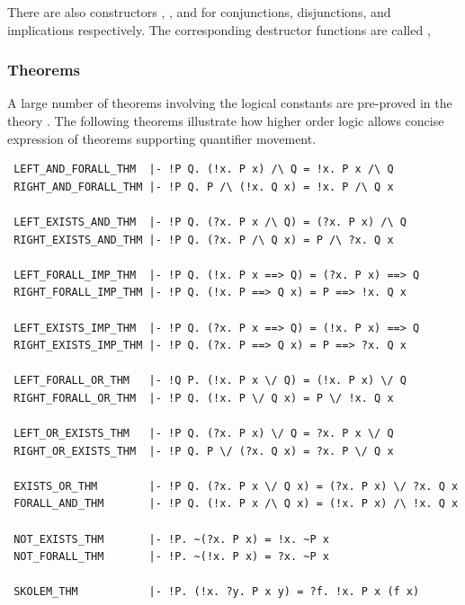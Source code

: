 \noindent There are also constructors
,
,
 and
for conjunctions, disjunctions, and implications respectively.
The corresponding destructor functions are called , \etc
%
%
%

\subsubsection{Theorems}

A large number of theorems involving the logical constants are
pre-proved in the theory . The following theorems
illustrate how higher order logic allows concise expression of
theorems supporting quantifier movement.

\begin{holboxed}
\begin{verbatim}
 LEFT_AND_FORALL_THM  |- !P Q. (!x. P x) /\ Q = !x. P x /\ Q
 RIGHT_AND_FORALL_THM |- !P Q. P /\ (!x. Q x) = !x. P /\ Q x

 LEFT_EXISTS_AND_THM  |- !P Q. (?x. P x /\ Q) = (?x. P x) /\ Q
 RIGHT_EXISTS_AND_THM |- !P Q. (?x. P /\ Q x) = P /\ ?x. Q x

 LEFT_FORALL_IMP_THM  |- !P Q. (!x. P x ==> Q) = (?x. P x) ==> Q
 RIGHT_FORALL_IMP_THM |- !P Q. (!x. P ==> Q x) = P ==> !x. Q x

 LEFT_EXISTS_IMP_THM  |- !P Q. (?x. P x ==> Q) = (!x. P x) ==> Q
 RIGHT_EXISTS_IMP_THM |- !P Q. (?x. P ==> Q x) = P ==> ?x. Q x

 LEFT_FORALL_OR_THM   |- !Q P. (!x. P x \/ Q) = (!x. P x) \/ Q
 RIGHT_FORALL_OR_THM  |- !P Q. (!x. P \/ Q x) = P \/ !x. Q x

 LEFT_OR_EXISTS_THM   |- !P Q. (?x. P x) \/ Q = ?x. P x \/ Q
 RIGHT_OR_EXISTS_THM  |- !P Q. P \/ (?x. Q x) = ?x. P \/ Q x

 EXISTS_OR_THM        |- !P Q. (?x. P x \/ Q x) = (?x. P x) \/ ?x. Q x
 FORALL_AND_THM       |- !P Q. (!x. P x /\ Q x) = (!x. P x) /\ !x. Q x

 NOT_EXISTS_THM       |- !P. ~(?x. P x) = !x. ~P x
 NOT_FORALL_THM       |- !P. ~(!x. P x) = ?x. ~P x

 SKOLEM_THM           |- !P. (!x. ?y. P x y) = ?f. !x. P x (f x)
\end{verbatim}
\end{holboxed}

